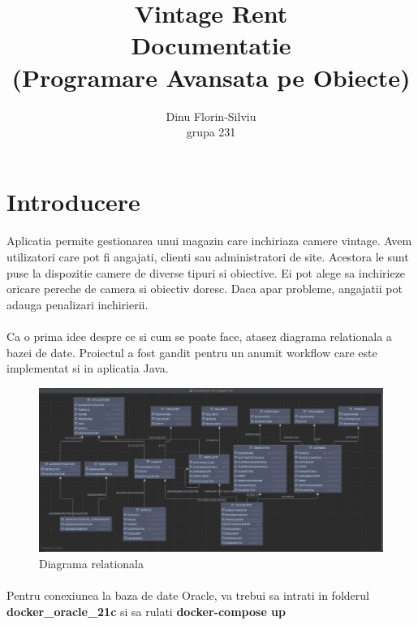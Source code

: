 \documentclass[oneside]{article}
\title{%
\textbf{Vintage Rent}  \\
\large Documentatie \\
(Programare Avansata pe Obiecte)}
\date{}
\author{Dinu Florin-Silviu \\ grupa 231}
\begin{document}
\maketitle
\tableofcontents

\newpage
{}

\section[Introducere]{Introducere}
\paragraph{} Aplicatia permite gestionarea unui magazin care inchiriaza camere vintage. Avem utilizatori care pot fi angajati, clienti sau administratori de site. Acestora le sunt puse la dispozitie camere de diverse tipuri si obiective. Ei pot alege sa inchirieze oricare pereche de camera si obiectiv doresc. Daca apar probleme, angajatii pot adauga penalizari inchirierii.

\paragraph{}Ca o prima idee despre ce si cum se poate face, atasez diagrama relationala a bazei de date. Proiectul a fost gandit pentru un anumit workflow care este implementat si in aplicatia Java.

\begin{figure}[ht]
    \centering
    \noindent\includegraphics[width=\linewidth]{diagrama.png}
    \caption{Diagrama relationala}
    \label{fig:diagrama}
\end{figure}

\paragraph{} Pentru conexiunea la baza de date Oracle, va trebui sa intrati in folderul \textbf{docker\_oracle\_21c} si sa rulati \textbf{docker-compose up} 
\end{document}
